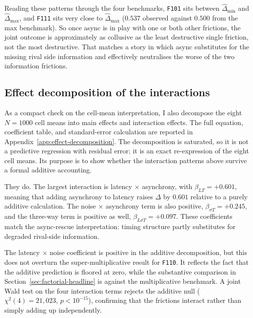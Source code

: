 Reading these patterns through the four benchmarks, \texttt{F101} sits between $\widehat\Delta_{\mathrm{min}}$ and $\widehat\Delta_{\mathrm{max}}$, and \texttt{F111} sits very close to $\widehat\Delta_{\mathrm{max}}$ ($0.537$ observed against $0.500$ from the max benchmark). So once async is in play with one or both other frictions, the joint outcome is approximately as collusive as the least destructive single friction, not the most destructive. That matches a story in which async substitutes for the missing rival side information and effectively neutralises the worse of the two information frictions.


\subsection{Effect decomposition of the interactions}
\label{sec:factorial-regression}

As a compact check on the cell-mean interpretation, I also decompose the eight $N=1000$ cell means into main effects and interaction effects. The full equation, coefficient table, and standard-error calculation are reported in Appendix~\ref{app:effect-decomposition}. The decomposition is saturated, so it is not a predictive regression with residual error; it is an exact re-expression of the eight cell means. Its purpose is to show whether the interaction patterns above survive a formal additive accounting.

They do. The largest interaction is latency $\times$ asynchrony, with $\beta_{LT}=+0.601$, meaning that adding asynchrony to latency raises $\Delta$ by $0.601$ relative to a purely additive calculation. The noise $\times$ asynchrony term is also positive, $\beta_{\sigma T}=+0.245$, and the three-way term is positive as well, $\beta_{L\sigma T}=+0.097$. These coefficients match the async-rescue interpretation: timing structure partly substitutes for degraded rival-side information.

The latency $\times$ noise coefficient is positive in the additive decomposition, but this does not overturn the super-multiplicative result for \texttt{F110}. It reflects the fact that the additive prediction is floored at zero, while the substantive comparison in Section~\ref{sec:factorial-headline} is against the multiplicative benchmark. A joint Wald test on the four interaction terms rejects the additive null ($\chi^2(4)=21{,}023$, $p<10^{-15}$), confirming that the frictions interact rather than simply adding up independently.

